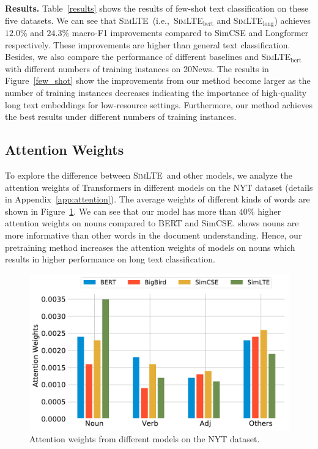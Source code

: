 \documentclass[11pt]{article}
\newcommand{\our}{\mbox{\textsc{SimLTE}}}
\begin{document}
\textbf{Results.} 
Table~\ref{results} shows the results of few-shot text classification on these five datasets. 
We can see that \our~(i.e.,~\our$_{\mathrm{bert}}$ and \our$_{\mathrm{long}}$) achieves $12.0\%$ and $24.3\%$ macro-F1 improvements compared to SimCSE and Longformer respectively. These improvements are higher than general text classification. 
Besides, we also compare the performance of different baselines and \our$_{\mathrm{bert}}$ with different numbers of training instances on 20News. 
The results in Figure~\ref{few_shot} show the improvements from our method become larger as the number of training instances decreases indicating the importance of high-quality long text embeddings for low-resource settings. 
Furthermore, our method achieves the best results under different numbers of training instances.

\subsection{Attention Weights}
To explore the difference between \our~and other models, we analyze the attention weights of Transformers in different models on the NYT dataset (details in Appendix~\ref{app:attention}). The average weights of different kinds of words are shown in Figure~\ref{attentions}.  We can see that our model has more than $40\%$ higher attention weights on nouns compared to BERT and SimCSE. \citet{martin-johnson-2015-efficient} shows nouns are more informative than other words in the document understanding. Hence, our pretraining method increases the attention weights of models on nouns which results in higher performance on long text classification. 

\begin{figure}
\centering
\includegraphics[width=0.8\linewidth]{fig/attentions.pdf}
\caption{Attention weights from different models on the NYT dataset.}  
\label{attentions}
\end{figure}
\end{document}
